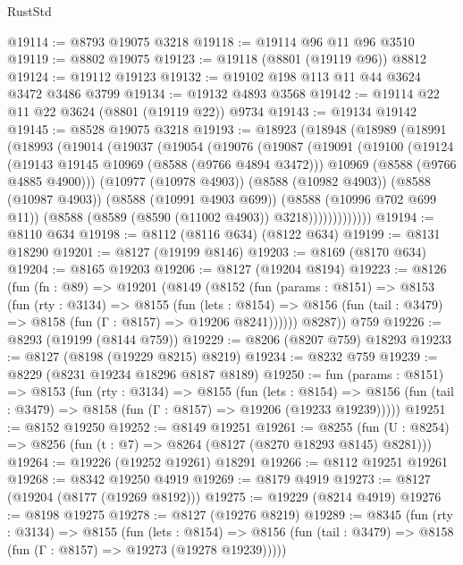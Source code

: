 \begin{lexlean}{RustStd}
\begin{coremodule}
@19114 := @8793 @19075 @3218
@19118 := @19114 @96 @11 @96 @3510
@19119 := @8802 @19075
@19123 := @19118 (@8801 (@19119 @96)) @8812
@19124 := @19112 @19123
@19132 := @19102 @198 @113 @11 @44 @3624 @3472 @3486 @3799
@19134 := @19132 @4893 @3568
@19142 := @19114 @22 @11 @22 @3624 (@8801 (@19119 @22)) @9734
@19143 := @19134 @19142
@19145 := @8528 @19075 @3218
@19193 := @18923
    (@18948
      (@18989
        (@18991
          (@18993
            (@19014
              (@19037
                (@19054
                  (@19076
                    (@19087
                      (@19091
                        (@19100
                          (@19124
                            (@19143 @19145 @10969 (@8588 (@9766 @4894 @3472)))
                            @10969
                            (@8588 (@9766 @4885 @4900)))
                          (@10977 (@10978 @4903))
                          (@8588 (@10982 @4903))
                          (@8588 (@10987 @4903))
                          (@8588 (@10991 @4903 @699))
                          (@8588 (@10996 @702 @699 @11))
                          (@8588 (@8589 (@8590 (@11002 @4903)) @3218)))))))))))))
@19194 := @8110 @634
@19198 := @8112 (@8116 @634) (@8122 @634)
@19199 := @8131 @18290
@19201 := @8127 (@19199 @8146)
@19203 := @8169 (@8170 @634)
@19204 := @8165 @19203
@19206 := @8127 (@19204 @8194)
@19223 := @8126
    (fun (fn : @89) =>
    @19201
      (@8149
        (@8152
          (fun (params : @8151) =>
          @8153
            (fun (rty : @3134) =>
            @8155
              (fun (lets : @8154) =>
              @8156 (fun (tail : @3479) => @8158 (fun (Γ : @8157) => @19206 @8241))))))
        @8287))
    @759
@19226 := @8293 (@19199 (@8144 @759))
@19229 := @8206 (@8207 @759) @18293
@19233 := @8127 (@8198 (@19229 @8215) @8219)
@19234 := @8232 @759
@19239 := @8229 (@8231 @19234 @18296 @8187 @8189)
@19250 := fun (params : @8151) =>
  @8153
    (fun (rty : @3134) =>
    @8155
      (fun (lets : @8154) =>
      @8156 (fun (tail : @3479) => @8158 (fun (Γ : @8157) => @19206 (@19233 @19239)))))
@19251 := @8152 @19250
@19252 := @8149 @19251
@19261 := @8255
    (fun (U : @8254) => @8256 (fun (t : @7) => @8264 (@8127 (@8270 @18293 @8145) @8281)))
@19264 := @19226 (@19252 @19261) @18291
@19266 := @8112 @19251 @19261
@19268 := @8342 @19250 @4919
@19269 := @8179 @4919
@19273 := @8127 (@19204 (@8177 (@19269 @8192)))
@19275 := @19229 (@8214 @4919)
@19276 := @8198 @19275
@19278 := @8127 (@19276 @8219)
@19289 := @8345
    (fun (rty : @3134) =>
    @8155
      (fun (lets : @8154) =>
      @8156 (fun (tail : @3479) => @8158 (fun (Γ : @8157) => @19273 (@19278 @19239)))))

\end{coremodule}
\end{lexlean}
